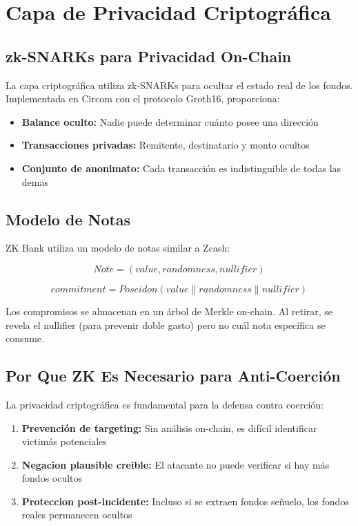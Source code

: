 \documentclass[12pt,a4paper,twoside]{book}
\begin{document}
\section{Capa de Privacidad Criptográfica}

\subsection{zk-SNARKs para Privacidad On-Chain}

La capa criptográfica utiliza zk-SNARKs para ocultar el estado real de los fondos. Implementada en Circom con el protocolo Groth16, proporciona:

\begin{itemize}
    \item \textbf{Balance oculto:} Nadie puede determinar cuánto posee una dirección
    \item \textbf{Transacciones privadas:} Remitente, destinatario y monto ocultos
    \item \textbf{Conjunto de anonimato:} Cada transacción es indistinguible de todas las demas
\end{itemize}

\subsection{Modelo de Notas}

ZK Bank utiliza un modelo de notas similar a Zcash:

\begin{equation}
Note = (value, randomness, nullifier)
\end{equation}

\begin{equation}
commitment = Poseidon(value \| randomness \| nullifier)
\end{equation}

Los compromisos se almacenan en un árbol de Merkle on-chain. Al retirar, se revela el nullifier (para prevenir doble gasto) pero no cuál nota específica se consume.

\subsection{Por Que ZK Es Necesario para Anti-Coerción}

La privacidad criptográfica es fundamental para la defensa contra coerción:

\begin{enumerate}
    \item \textbf{Prevención de targeting:} Sin análisis on-chain, es difícil identificar victimás potenciales
    \item \textbf{Negacion plausible creible:} El atacante no puede verificar si hay más fondos ocultos
    \item \textbf{Proteccion post-incidente:} Incluso si se extraen fondos señuelo, los fondos reales permanecen ocultos
\end{enumerate}
\end{document}
